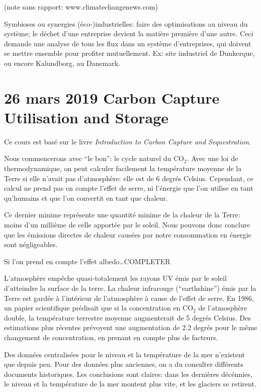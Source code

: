 \documentclass{article}
\begin{document}
 (note sans rapport: www.climatechangenews.com) \par
 Symbioses ou synergies (éco-)industrielles: faire des optimisations au niveau du système; le déchet d'une entreprise devient la matière première d'une autre. Ceci demande une analyse de tous les flux dans un système d'entreprises, qui doivent se mettre ensemble pour profiter mutuellement. Ex: site industriel de Dunkerque, ou encore Kalundborg, au Danemark.


\section{26 mars 2019 \quad Carbon Capture Utilisation and Storage}
 Ce cours est basé sur le livre \emph{Introduction to Carbon Capture and Sequestration}. \par
 Nous commencerons avec ``le bon'': le cycle naturel du CO$_2$. Avec une loi de thermodynamique, on peut calculer facilement la température moyenne de la Terre si elle n'avait pas d'atmosphère: elle est de 6 degrés Celsius. Cependant, ce calcul ne prend pas en compte l'effet de serre, ni l'énergie que l'on utilise en tant qu'humains et que l'on convertit en tant que chaleur. \par
 Ce dernier minime représente une quantité minime de la chaleur de la Terre: moins d'un millième de celle apportée par le soleil. Nous pouvons donc conclure que les émissions directes de chaleur causées par notre consommation en énergie sont négligeables. \par
 Si l'on prend en compte l'effet albedo\ldots COMPLETER \par
 L'atmosphère empêche quasi-totalement les rayons UV émis par le soleil d'atteindre la surface de la terre. La chaleur infrarouge (``earthshine'') émis par la Terre est gardée à l'intérieur de l'atmosphère à cause de l'effet de serre. En 1986, un papier scientifique prédisait que si la concentration en CO$_2$ de l'atmosphère double, la température terrestre moyenne augmenterait de 5 degrés Celsius. Des estimations plus récentes prévoyent une augmentation de 2.2 degrés pour le même changement de concentration, en prenant en compte plus de facteurs. \par
 Des données centralisées pour le niveau et la température de la mer n'existent que depuis peu. Pour des données plus anciennes, on a du consulter différents documents historiques. Les conclusions sont claires: dans les dernières décénnies, le niveau et la température de la mer montent plus vite, et les glaciers se retirent. \par
\end{document}
